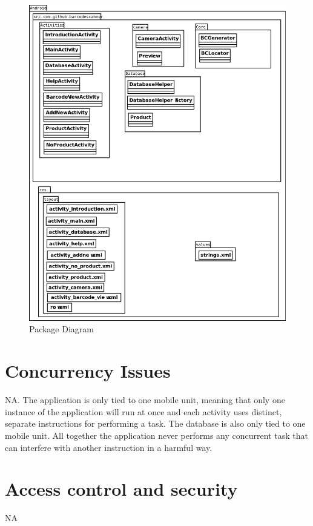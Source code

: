 \documentclass{report}
\begin{document}
\begin{figure}[H]
		\centering
		\includegraphics[width=\textwidth]{packagediagram.png}
		\caption{Package Diagram}
		\label{fig:Package Diagram}
\end{figure}

\pagebreak

\section{Concurrency Issues}
NA. The application is only tied to one mobile unit, meaning that only one instance of the application will run at once and each activity uses distinct, separate instructions for performing a task. The database is also only tied to one mobile unit. All together the application never performs any concurrent task that can interfere with another instruction in a harmful way. 


\section{Access control and security}
NA
\end{document}
